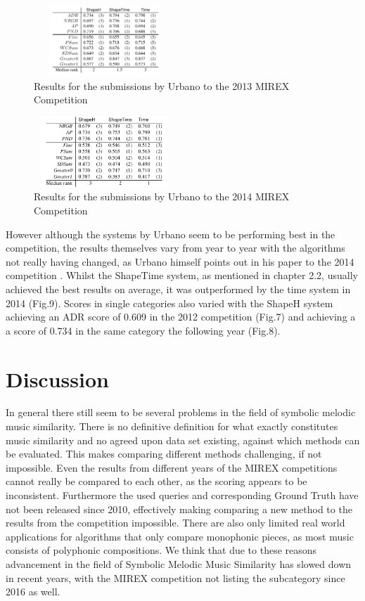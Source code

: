 \documentclass{llncs}
\begin{document}
\begin{itemize}
\begin{figure}[h!]
			\centering
            \includegraphics[width=200px,height=100px,keepaspectratio]{urbano_mirex_2013_results}
			\caption{Results for the submissions by Urbano to the 2013 MIREX Competition \cite{five_point_three}}
        \end{figure}
        \begin{figure}[h!]
			\centering
            \includegraphics[width=200px,height=100px,keepaspectratio]{urbano_mirex_2014_results}
			\caption{Results for the submissions by Urbano to the 2014 MIREX Competition \cite{five_point_two}}
        \end{figure}
        
        However although the systems by Urbano seem to be performing best in the competition, the results themselves vary from year to year with the algorithms not really having changed, as Urbano himself points out in his paper to the 2014 competition \cite{five_point_five}.  Whilst the ShapeTime system, as mentioned in chapter 2.2, usually achieved the best results on average, it was outperformed by the time system in 2014 (Fig.9). Scores in single categories also varied with the ShapeH system achieving an ADR score of 0.609 in the 2012 competition (Fig.7) and achieving a a score of 0.734 in the same category the following year (Fig.8). 


	\section{Discussion}
	
	In general there still seem to be  several problems in the field of symbolic melodic music similarity.
	There is no definitive definition for what exactly constitutes music similarity and no agreed upon data set existing, against which methods can be evaluated. This makes comparing different methods challenging, if not impossible. Even the results from different years of the MIREX competitions cannot really be compared to each other, as the scoring appears to be inconsistent. Furthermore the used queries and corresponding Ground Truth have not been released since 2010, effectively making comparing a new method to the results from the competition impossible. There are also only limited real world applications for algorithms that only compare monophonic pieces, as most music consists of polyphonic compositions. We think that due to these reasons advancement in the field of Symbolic Melodic Music Similarity has slowed down in recent years, with the MIREX competition not listing the subcategory since 2016 as well.



\end{itemize}
\end{document}
